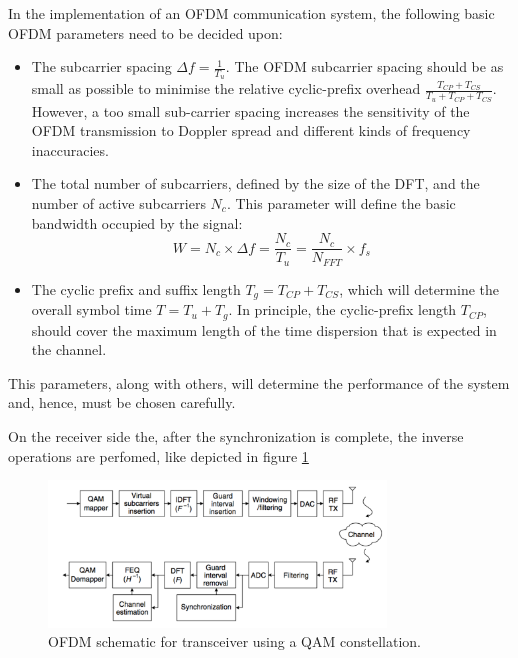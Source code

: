 \documentclass[12pt,a4paper,openright]{report}
\begin{document}
In the implementation of an OFDM communication system, the following basic OFDM parameters need to be decided upon:
\begin{itemize}
\item The subcarrier spacing $\Delta f = \frac{1}{T_u}$. The OFDM subcarrier spacing should be as small as possible to minimise the relative cyclic-prefix overhead $\frac{T_{CP}+T_{CS}}{T_u + T_{CP} + T_{CS}}$. However, a too small sub-carrier spacing increases the sensitivity of the OFDM transmission to Doppler spread and different kinds of frequency inaccuracies.

\item The total number of subcarriers, defined by the size of the DFT, and the number of active subcarriers $N_c$. This parameter will define the basic bandwidth occupied by the signal: 
\begin{equation}\label{eq:OFDMbw}
W = N_c \times \Delta f = \frac{N_c}{T_u}=\frac{N_c}{N_{FFT}}\times f_s
\end{equation}

\item The cyclic prefix and suffix length $T_g = T_{CP} + T_{CS}$, which will determine the overall symbol time $T = T_u + T_g$. In principle, the cyclic-prefix length $T_{CP}$, should cover the maximum length of the time dispersion that is expected in the channel. 
\end{itemize}

This parameters, along with others, will determine the performance of the system and, hence, must be chosen carefully. 

On the receiver side the, after the synchronization is complete, the inverse operations are perfomed, like depicted in figure \ref{fig:ofdmtransceiver}

 \begin{figure}[H]
  \centering
    \includegraphics[width=0.8\textwidth]{ofdmtransceiver.pdf}
    \caption[OFDM transceiver using QAM]{OFDM schematic for transceiver using a QAM constellation.}
    \label{fig:ofdmtransceiver}
\end{figure}
\end{document}
